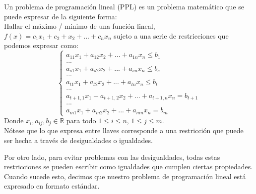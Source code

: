 \documentclass[11pt,fleqn]{book} %
\begin{document}
\begin{definition}
	Un problema de programación lineal (PPL) es un problema matemático que se puede expresar de la siguiente forma: \\
	Hallar el máximo / mínimo de una función lineal, $f(x)=c_1x_1+c_2+x_2+...+c_nx_n$ sujeto a una serie de restricciones que podemos expresar como:
	\begin{equation*}
	\left\lbrace
	\begin{array}{l}
	a_{11}x_1+a_{12}x_2+...+a_{1n}x_n \leq b_1 \\
	... \\
	a_{s1}x_1+a_{s2}x_2+...+a_{sn}x_n \leq b_s \\
	... \\
	a_{t1}x_1+a_{t2}x_2+...+a_{tn}x_n \leq b_t \\
	... \\
	a_{t+1,1}x_1+a_{t+1,2}x_2+...+a_{t+1,n}x_n = b_{t+1} \\
	... \\
	a_{m1}x_1+a_{m2}x_2+...+a_{mn}x_n = b_{m}
	\end{array}
	\right.
	\end{equation*}
	Donde $x_i, a_{ij}, b_j \in \mathbb{R}$ para todo $1\leq i \leq n$, $1 \leq j \leq m$. \\
	Nótese que lo que expresa entre llaves corresponde a una restricción que puede ser hecha a través de desigualdades o igualdades.
\end{definition}
Por otro lado, para evitar problemas con las desigualdades, todas estas restricciones se pueden escribir como igualdades que cumplen ciertas propiedades. \\
Cuando sucede esto, decimos que nuestro problema de programación lineal está expresado en formato estándar.
\end{document}
